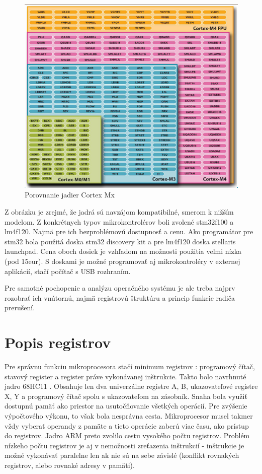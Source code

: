 \begin{figure}[ht]
\begin{center}
\begin{minipage}{1.1\linewidth}
\begin{center}
\includegraphics[width=.8\textwidth]{images/cm_instructions.png}
\caption{Porovnanie jadier Cortex Mx }
\label{obr1}
\end{center}
\end{minipage}
\end{center}
\end{figure}

Z obrázku je zrejmé, že jadrá sú navzájom kompatibilné, smerom k nižším modelom. Z konkrétnych typov mikrokontrolérov boli zvolené stm32f100 a lm4f120. Najmä pre ich bezproblémovú dostupnosť a cenu. Ako programátor pre stm32 bola použitá doska stm32 discovery kit a pre lm4f120 doska stellaris launchpad. Cena oboch dosiek je vzhľadom na možnosti použitia veľmi nízka (pod 15eur). S doskami je možné programovať aj mikrokontroléry v externej aplikácií, stačí počítač s USB rozhraním.

Pre samotné pochopenie a analýzu operačného systému je ale treba najprv rozobrať ich vnútornú, najmä registrovú štruktúru a princip funkcie radiča prerušení.

\section{Popis registrov}

Pre správnu funkciu mikroprocesora stačí minimum registrov : programový čítač, stavový register a register práve vykonávanej inštrukcie. Takto bolo navrhnuté jadro 68HC11 \cite{68HC11}. Obsahuje len dva univerzálne registre A, B, ukazovateľové registre X, Y a programový čítač spolu s ukazovateľom na zásobník. Snaha bola využiť dostupnú pamäť ako priestor na usutočňovanie všetkých operácií. Pre zvýšenie výpočtového výkonu, to však bola nesprávna cesta. Mikroprocesor musel takmer vždy vyberať operandy z pamäte a tieto operácie zaberú viac času, ako prístup do registrov. Jadro ARM preto zvolilo cestu vysokého počtu registrov. Problém nízkeho počtu registrov je aj v nemožnosti zreťazenia inštrukcií - inštrukcie je možné vykonávať paralelne len ak nie sú na sebe závislé (konflikt rovnakých registrov, alebo rovnaké adresy v pamäti).

